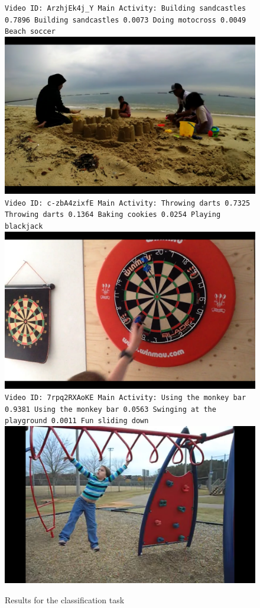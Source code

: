 \begin{figure}[H]
\begin{center}
\texttt{Video ID: ArzhjEk4j_Y
Main Activity: Building sandcastles
0.7896	Building sandcastles
0.0073	Doing motocross
0.0049	Beach soccer}
\includegraphics[width=0.5\linewidth]{img/results/results_visualization_classification_1}
\texttt{Video ID: c-zbA4zixfE
Main Activity: Throwing darts
0.7325	Throwing darts
0.1364	Baking cookies
0.0254	Playing blackjack}
\includegraphics[width=0.5\linewidth]{img/results/results_visualization_classification_2}
\texttt{Video ID: 7rpq2RXAoKE
Main Activity: Using the monkey bar
0.9381	Using the monkey bar
0.0563	Swinging at the playground
0.0011	Fun sliding down}
\includegraphics[width=0.5\linewidth]{img/results/results_visualization_classification_3}
\end{center}
\caption{Results for the classification task}
\label{fig:results_visualization_classification}
\end{figure}

